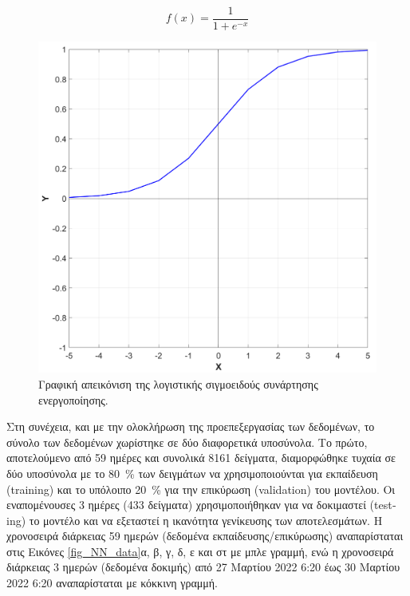 \documentclass[12pt, a4paper]{report} %
\newcommand{\english}{\foreignlanguage{english}}
\begin{document}
\begin{equation}
    f(x) = \frac{1}{1 + e^{-x}}
    \label{eq_logistic_act_fcn}
\end{equation}

\begin{figure}[ht]%
    \centering
    \includegraphics[scale=0.4]{Figures/log_act_fcn.png}
    \caption{Γραφική απεικόνιση της λογιστικής σιγμοειδούς συνάρτησης ενεργοποίησης.}
    \label{fig_log_sigm}
\end{figure}

Στη συνέχεια, και με την ολοκλήρωση της προεπεξεργασίας των δεδομένων, το σύνολο  των δεδομένων χωρίστηκε σε δύο 
διαφορετικά υποσύνολα. Το πρώτο, αποτελούμενο από 59 ημέρες και συνολικά 8161 δείγματα, διαμορφώθηκε τυχαία σε δύο 
υποσύνολα με το \SI{80}{\percent} των δειγμάτων να χρησιμοποιούνται για εκπαίδευση (\english{training}) και το υπόλοιπο 
\SI{20}{\percent} για την επικύρωση (\english{validation}) του μοντέλου. Οι εναπομένουσες 3 ημέρες (433 δείγματα) 
χρησιμοποιήθηκαν για να δοκιμαστεί (\english{testing}) το μοντέλο και να εξεταστεί η ικανότητα γενίκευσης των 
αποτελεσμάτων. Η χρονοσειρά διάρκειας 59 ημερών (δεδομένα εκπαίδευσης/επικύρωσης) αναπαρίσταται στις Εικόνες 
\ref{fig_NN_data}α, β, γ, δ, ε και στ με μπλε γραμμή, ενώ η χρονοσειρά διάρκειας 3 ημερών (δεδομένα δοκιμής) από 27 
Μαρτίου 2022 6:20 έως 30 Μαρτίου 2022 6:20 αναπαρίσταται με κόκκινη γραμμή.
\end{document}
